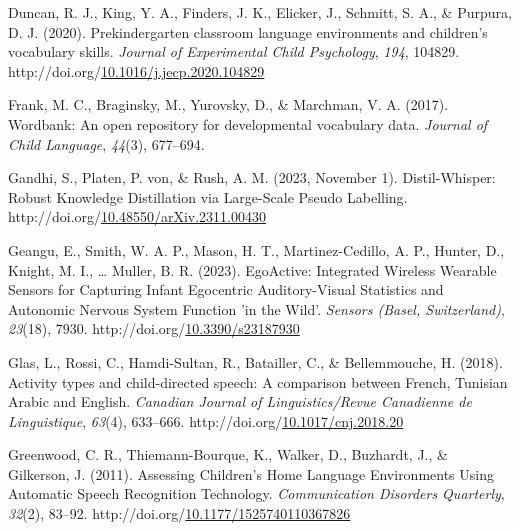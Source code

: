 \documentclass[10pt, letterpaper]{article}
\newlength{\cslhangindent}
\newlength{\cslentryspacingunit} %
\newenvironment{CSLReferences}[2] %
{%
	\setlength{\parindent}{0pt}
	\ifodd #1
	\let\oldpar\par
	\def\par{\hangindent=\cslhangindent\oldpar}
	\fi
}%
{}
\begin{document}
\begin{CSLReferences}{1}{0}
\leavevmode{}%
Duncan, R. J., King, Y. A., Finders, J. K., Elicker, J., Schmitt, S. A.,
\& Purpura, D. J. (2020). Prekindergarten classroom language
environments and children's vocabulary skills. \emph{Journal of
Experimental Child Psychology}, \emph{194}, 104829.
http://doi.org/\href{https://doi.org/10.1016/j.jecp.2020.104829}{10.1016/j.jecp.2020.104829}

\leavevmode{}%
Frank, M. C., Braginsky, M., Yurovsky, D., \& Marchman, V. A. (2017).
Wordbank: An open repository for developmental vocabulary data.
\emph{Journal of Child Language}, \emph{44}(3), 677--694.

\leavevmode{}%
Gandhi, S., Platen, P. von, \& Rush, A. M. (2023, November 1).
Distil-{Whisper}: {Robust Knowledge Distillation} via {Large-Scale
Pseudo Labelling}.
http://doi.org/\href{https://doi.org/10.48550/arXiv.2311.00430}{10.48550/arXiv.2311.00430}

\leavevmode{}%
Geangu, E., Smith, W. A. P., Mason, H. T., Martinez-Cedillo, A. P.,
Hunter, D., Knight, M. I., \ldots{} Muller, B. R. (2023). {EgoActive}:
{Integrated Wireless Wearable Sensors} for {Capturing Infant Egocentric
Auditory-Visual Statistics} and {Autonomic Nervous System Function} 'in
the {Wild}'. \emph{Sensors (Basel, Switzerland)}, \emph{23}(18), 7930.
http://doi.org/\href{https://doi.org/10.3390/s23187930}{10.3390/s23187930}

\leavevmode{}%
Glas, L., Rossi, C., Hamdi-Sultan, R., Batailler, C., \& Bellemmouche,
H. (2018). Activity types and child-directed speech: A comparison
between {French}, {Tunisian Arabic} and {English}. \emph{Canadian
Journal of Linguistics/Revue Canadienne de Linguistique}, \emph{63}(4),
633--666.
http://doi.org/\href{https://doi.org/10.1017/cnj.2018.20}{10.1017/cnj.2018.20}

\leavevmode{}%
Greenwood, C. R., Thiemann-Bourque, K., Walker, D., Buzhardt, J., \&
Gilkerson, J. (2011). Assessing {Children}'s {Home Language Environments
Using Automatic Speech Recognition Technology}. \emph{Communication
Disorders Quarterly}, \emph{32}(2), 83--92.
http://doi.org/\href{https://doi.org/10.1177/1525740110367826}{10.1177/1525740110367826}


\end{CSLReferences}
\end{document}

